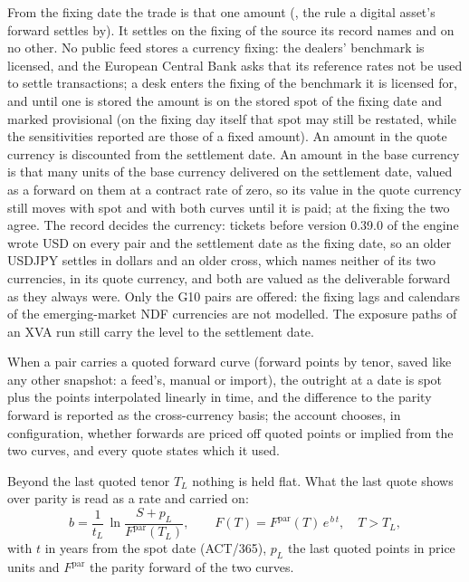 \documentclass[11pt,a4paper]{article}
\newcommand{\code}[1]{\ifmmode\text{\small\texttt{\detokenize{#1}}}\else{\small\path{#1}}\fi}
\begin{document}
From the fixing date the trade is that one amount (\code{settlement/rule.py}, the rule a digital asset's forward settles by). It settles on the fixing of the source its record names and on no other. No public feed stores a currency fixing: the dealers' benchmark is licensed, and the European Central Bank asks that its reference rates not be used to settle transactions; a desk enters the fixing of the benchmark it is licensed for, and until one is stored the amount is on the stored spot of the fixing date and marked provisional (on the fixing day itself that spot may still be restated, while the sensitivities reported are those of a fixed amount). An amount in the quote currency is discounted from the settlement date. An amount in the base currency is that many units of the base currency delivered on the settlement date, valued as a forward on them at a contract rate of zero, so its value in the quote currency still moves with spot and with both curves until it is paid; at the fixing the two agree. The record decides the currency: tickets before version 0.39.0 of the engine wrote USD on every pair and the settlement date as the fixing date, so an older USDJPY settles in dollars and an older cross, which names neither of its two currencies, in its quote currency, and both are valued as the deliverable forward as they always were. Only the G10 pairs are offered: the fixing lags and calendars of the emerging-market NDF currencies are not modelled. The exposure paths of an XVA run still carry the level to the settlement date.

When a pair carries a quoted forward curve (forward points by tenor, saved like any other snapshot: a feed's, manual or import), the outright at a date is spot plus the points interpolated linearly in time, and the difference to the parity forward is reported as the cross-currency basis; the account chooses, in configuration, whether forwards are priced off quoted points or implied from the two curves, and every quote states which it used.

Beyond the last quoted tenor $T_L$ nothing is held flat. What the last quote shows over parity is read as a rate and carried on:
\begin{equation}
b=\frac{1}{t_L}\,\ln\frac{S+p_L}{F^{\mathrm{par}}(T_L)},\qquad F(T)=F^{\mathrm{par}}(T)\,e^{\,b\,t},\quad T>T_L,
\end{equation}
with $t$ in years from the spot date (ACT/365), $p_L$ the last quoted points in price units and $F^{\mathrm{par}}$ the parity forward of the two curves.
\end{document}
